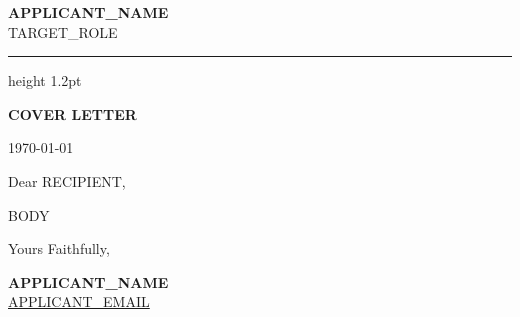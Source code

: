 \documentclass[11pt,a4paper]{article}
\begin{document}
\begin{center}
  {\LARGE\bfseries {{APPLICANT_NAME}} } \\[4pt]
  {\normalsize\textcolor{UIBlue}{ {{TARGET_ROLE}} }}
\end{center}

\vspace{6pt}
{\color{UIBlue}\hrule height 1.2pt}
\vspace{12pt}

\begin{center}
  {\large\bfseries\textcolor{UIBlue}{COVER LETTER}}
\end{center}

\vspace{8pt}

\hfill \today

\vspace{12pt}

Dear {{RECIPIENT}},

\vspace{6pt}

{{BODY}}

\vspace{18pt}

Yours Faithfully,

\vspace{18pt}

\textbf{ {{APPLICANT_NAME}} } \\
\href{mailto:{{APPLICANT_EMAIL}}}{{{APPLICANT_EMAIL}}} \\
\end{document}
